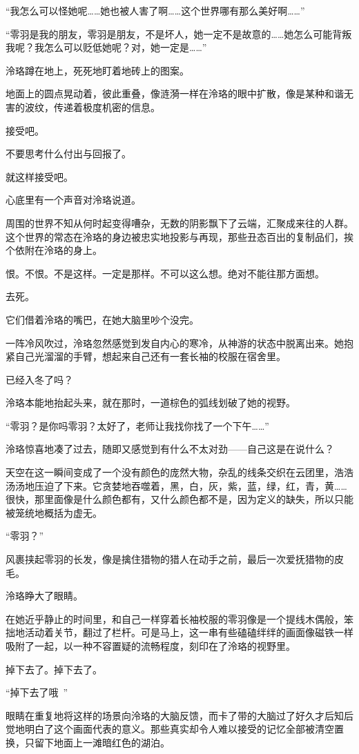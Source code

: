 \documentclass[UTF8, scheme = chinese, openany]{ctexbook}
\begin{document}
“我怎么可以怪她呢……她也被人害了啊……这个世界哪有那么美好啊……”

“零羽是我的朋友，零羽是朋友，不是坏人，她一定不是故意的……她怎么可能背叛我呢？我怎么可以贬低她呢？对，她一定是……”

泠珞蹲在地上，死死地盯着地砖上的图案。

地面上的圆点晃动着，彼此重叠，像涟漪一样在泠珞的眼中扩散，像是某种和谐无害的波纹，传递着极度机密的信息。

接受吧。

不要思考什么付出与回报了。

就这样接受吧。

心底里有一个声音对泠珞说道。

周围的世界不知从何时起变得嘈杂，无数的阴影飘下了云端，汇聚成来往的人群。这个世界的常态在泠珞的身边被忠实地投影与再现，那些丑态百出的复制品们，挨个依附在泠珞的身上。

恨。不恨。不是这样。一定是那样。不可以这么想。绝对不能往那方面想。

去死。

它们借着泠珞的嘴巴，在她大脑里吵个没完。

一阵冷风吹过，泠珞忽然感觉到发自内心的寒冷，从神游的状态中脱离出来。她抱紧自己光溜溜的手臂，想起来自己还有一套长袖的校服在宿舍里。

已经入冬了吗？

泠珞本能地抬起头来，就在那时，一道棕色的弧线划破了她的视野。

“零羽？是你吗零羽？太好了，老师让我找你找了一个下午……”

泠珞惊喜地凑了过去，随即又感觉到有什么不太对劲——自己这是在说什么？

天空在这一瞬间变成了一个没有颜色的庞然大物，杂乱的线条交织在云团里，浩浩汤汤地压迫了下来。它贪婪地吞噬着，黑，白，灰，紫，蓝，绿，红，青，黄……很快，那里面像是什么颜色都有，又什么颜色都不是，因为定义的缺失，所以只能被笼统地概括为虚无。

“零羽？”

风裹挟起零羽的长发，像是擒住猎物的猎人在动手之前，最后一次爱抚猎物的皮毛。

泠珞睁大了眼睛。

在她近乎静止的时间里，和自己一样穿着长袖校服的零羽像是一个提线木偶般，笨拙地活动着关节，翻过了栏杆。可是马上，这一串有些磕磕绊绊的画面像磁铁一样吸附了一起，以一种不容置疑的流畅程度，刻印在了泠珞的视野里。

掉下去了。掉下去了。

“掉下去了哦~”

眼睛在重复地将这样的场景向泠珞的大脑反馈，而卡了带的大脑过了好久才后知后觉地明白了这个画面代表的意义。那些真实却令人难以接受的记忆全部被清空置换，只留下地面上一滩暗红色的湖泊。
\end{document}
